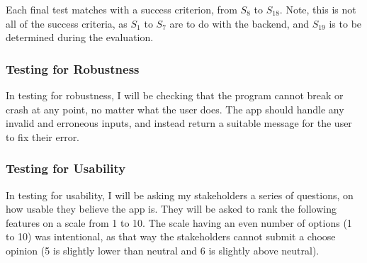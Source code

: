 \documentclass[12pt]{report}
\begin{document}
Each final test matches with a success criterion, from $S_{8}$ to $S_{18}$. Note, this is not all of the success criteria, as $S_{1}$ to $S_{7}$ are to do with the backend, and $S_{19}$ is to be determined during the evaluation.

\subsubsection{Testing for Robustness}
In testing for robustness, I will be checking that the program cannot break or crash at any point, no matter what the user does. The app should handle any invalid and erroneous inputs, and instead return a suitable message for the user to fix their error.

\begin{center}
\end{center}

\subsubsection{Testing for Usability}
In testing for usability, I will be asking my stakeholders a series of questions, on how usable they believe the app is. They will be asked to rank the following features on a scale from 1 to 10. The scale having an even number of options (1 to 10) was intentional, as that way the stakeholders cannot submit a choose opinion (5 is slightly lower than neutral and 6 is slightly above neutral).

\begin{center}
\end{center}
\end{document}
